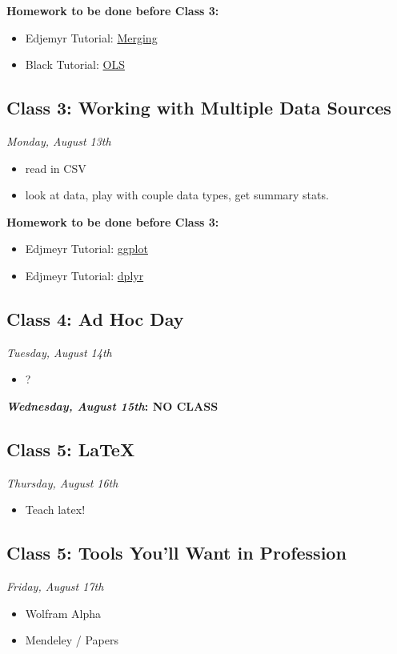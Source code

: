\documentclass[12pt]{article}
\begin{document}
\textbf{Homework to be done before Class 3:}
\begin{itemize}
    \item Edjemyr Tutorial: \href{https://sejdemyr.github.io/r-tutorials/basics/merging-appending/}{Merging}
    \item Black Tutorial: \href{https://www.cyclismo.org/tutorial/R/linearLeastSquares.html}{OLS}
\end{itemize}



\subsection*{Class 3: Working with Multiple Data Sources}
\emph{Monday, August 13th}
\begin{itemize}
    \item read in CSV
    \item look at data, play with couple data types, get summary stats.
\end{itemize}

\textbf{Homework to be done before Class 3:}
\begin{itemize}
    \item Edjmeyr Tutorial: \href{https://sejdemyr.github.io/r-tutorials/statistics/tutorial2.html#graphing-with-ggplot}{ggplot}
    \item Edjmeyr Tutorial: \href{https://sejdemyr.github.io/r-tutorials/basics/modifying-data/}{dplyr}
\end{itemize}


\subsection*{Class 4: Ad Hoc Day}
\emph{Tuesday, August 14th}
\begin{itemize}
    \item ?
\end{itemize}

\textbf{\emph{Wednesday, August 15th}: NO CLASS}

\subsection*{Class 5: LaTeX}
\emph{Thursday, August 16th}
\begin{itemize}
    \item Teach latex!
\end{itemize}

\subsection*{Class 5: Tools You'll Want in Profession}
\emph{Friday, August 17th}
\begin{itemize}
    \item Wolfram Alpha
    \item Mendeley / Papers
\end{itemize}
\end{document}
